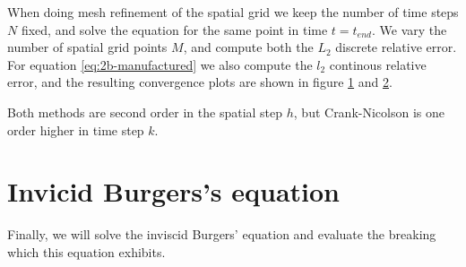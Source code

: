 When doing mesh refinement of the spatial grid we keep the number of time steps $N$ fixed, 
and solve the equation for the same point in time $t=t_{end}$. 
We vary the number of spatial grid points $M$, 
and compute both the $L_2$ discrete relative error. 
For equation \eqref{eq:2b-manufactured} we also compute the $l_2$ continous relative error, 
and the resulting convergence plots are shown in figure \ref{fig:2a-convergence} and \ref{fig:2b-convergence}. 

Both methods are second order in the spatial step $h$, 
but Crank-Nicolson is one order higher in time step $k$. 

\begin{figure}[ht]
    \centering
    
    \label{fig:2a-convergence}
\end{figure}

\begin{figure}[ht]
    \centering
    
    \label{fig:2b-convergence}
\end{figure}


%
%    

\section{Invicid Burgers's equation}

Finally, we will solve the inviscid Burgers' equation and evaluate the breaking which this equation exhibits. 

\begin{figure}[ht]
    \centering
    
\end{figure}
